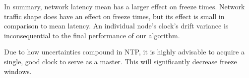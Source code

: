 In summary, network latency mean has a larger effect on freeze
times. Network traffic shape does have an effect on freeze times, but
its effect is small in comparison to mean latency. An individual
node's clock's drift variance is inconsequential to the final
performance of our algorithm.

Due to how uncertainties compound in NTP, it is highly advisable to
acquire a single, good clock to serve as a master. This will
significantly decrease freeze windows.

